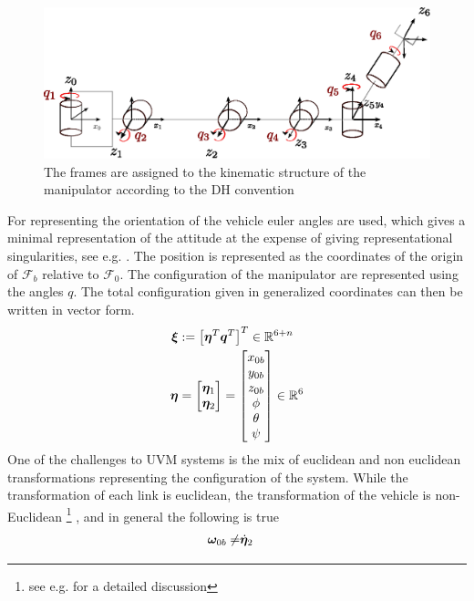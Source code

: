 \begin{figure}[h!]
	\centering
	\includegraphics[scale=0.7]{./figures/manipulator_kinematics.eps}
	\caption{The frames are assigned to the kinematic structure of the manipulator according to the DH convention}
	\label{fig:dh-manipulator}
\end{figure}
For representing the orientation of the vehicle euler angles are used, which gives a minimal representation of the attitude at the expense of giving representational singularities, see e.g. \cite{fs}. The position is represented as the coordinates of the origin of $\mathcal{F}_b$ relative to $\mathcal{F}_0$. The configuration of the manipulator are represented using the angles $q$. The total configuration given in generalized coordinates can then be written in vector form.
\begin{align*}
  \boldsymbol \xi&:= \left[ \boldsymbol \eta^T \boldsymbol q^T \right]^T \in \mathbb{R}^{6+n}
  \\
  \boldsymbol \eta &= \begin{bmatrix}\boldsymbol \eta_1 \\ \boldsymbol \eta_2 \end{bmatrix}  = \begin{bmatrix} x_{0b} \\ y_{0b} \\ z_{0b} \\ \phi \\ \theta \\ \psi \end{bmatrix} \in \mathbb{R}^{6}
\end{align*}
One of the challenges to UVM systems is the mix of euclidean and non euclidean transformations representing the configuration of the system. While the transformation of each link is euclidean, the transformation of the vehicle is non-Euclidean \footnote{see e.g. \cite{kristin_jant} for a detailed discussion} , and in general the following is true
\begin{align}
	\boldsymbol \omega_{0b} \neq & \dot{\boldsymbol \eta}_2
  \label{eq:quasi1}
\end{align}

